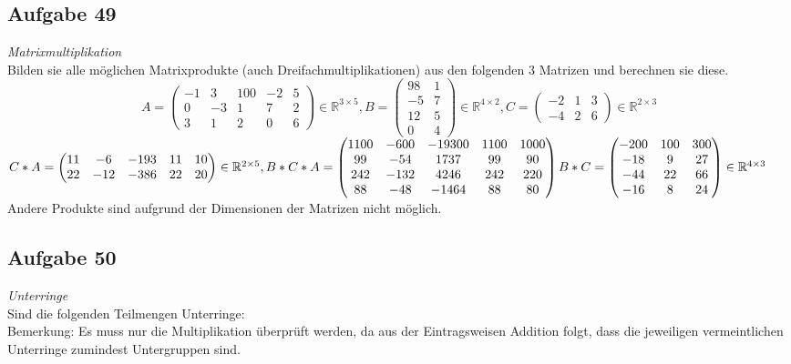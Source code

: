 \documentclass[12pt]{article}
\begin{document}
\subsection*{Aufgabe 49}\textit{Matrixmultiplikation}\\
Bilden sie alle m{\"o}glichen Matrixprodukte (auch Dreifachmultiplikationen) aus den folgenden 3 Matrizen und berechnen sie diese.\\
$$A=\begin{pmatrix}
-1 & 3 & 100 & -2 & 5 \\
0 & -3 & 1 & 7 & 2\\
3 & 1 & 2 & 0 & 6
\end{pmatrix} \in \mathbb{R}^{3\times5}, 
B=\begin{pmatrix}
98 & 1 \\ -5 & 7 \\ 12 & 5 \\ 0 & 4
\end{pmatrix} \in \mathbb{R}^{4\times2},
C=\begin{pmatrix}
-2 & 1 & 3 \\ -4 & 2 & 6
\end{pmatrix} \in \mathbb{R}^{2\times3}$$
$C*A=\begin{pmatrix}
11 & -6 & -193 & 11 & 10 \\
22 & -12 & -386 & 22 & 20
\end{pmatrix} \in \mathbb{R}^{2\times5},
B*C*A=\begin{pmatrix}
1100 & -600 & -19300 & 1100 & 1000 \\
99 & -54 & 1737 & 99 & 90 \\
242 & -132 & 4246 & 242 & 220 \\
88 & -48 & -1464 & 88 & 80
\end{pmatrix}\\
B*C=\begin{pmatrix}
-200 & 100 & 300 \\
-18 & 9 & 27 \\
-44 & 22 & 66 \\
-16 & 8 & 24
\end{pmatrix} \in \mathbb{R}^{4\times3}$\\
Andere Produkte sind aufgrund der Dimensionen der Matrizen nicht m{\"o}glich.
\subsection*{Aufgabe 50}\textit{Unterringe}\\
Sind die folgenden Teilmengen Unterringe:\\
Bemerkung: Es muss nur die Multiplikation {\"u}berpr{\"u}ft werden, da aus der Eintragsweisen Addition folgt, dass die jeweiligen vermeintlichen Unterringe zumindest Untergruppen sind.
\end{document}
